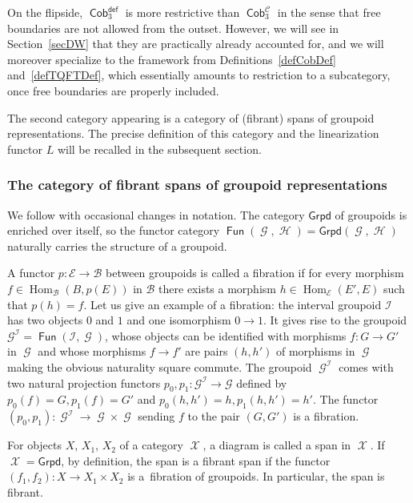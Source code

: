 \documentclass[pdftex]{sigma}
\DeclareMathOperator{\Hom}{Hom}
\DeclareMathOperator{\Fun}{\mathsf{Fun}}
\DeclareMathOperator{\Cob}{\mathsf{Cob}}
\DeclareMathOperator{\calc}{\mathcal{C}}
\DeclareMathOperator{\calx}{\mathcal{X}}
\DeclareMathOperator{\calg}{\mathcal{G}}
\DeclareMathOperator{\calh}{\mathcal{H}}
\DeclareMathOperator{\cali}{\mathcal{I}}
\numberwithin{equation}{section}
\theoremstyle{definition}
\begin{document}
On the flipside, $\Cob_3^{\mathsf{def}}$ is more restrictive than $\Cob_3^{\calc}$ in the sense that free boundaries are not allowed from the outset. However, we will see in Section~\ref{secDW} that they are practically already accounted for, and we will moreover specialize to the framework from Definitions~\ref{defCobDef} and~\ref{defTQFTDef}, which essentially amounts to restriction to a subcategory, once free boundaries are properly included.

The second category appearing is a category of (fibrant) spans of groupoid representations. The precise definition of this category and the linearization functor $L$ will be recalled in the subsequent section.

\subsubsection{The category of fibrant spans of groupoid representations}
We follow \cite[Section~2]{FMM} with occasional changes in notation.
The category $\mathsf{Grpd}$ of groupoids is enriched over itself, so the functor category $\Fun(\calg, \calh) = \mathsf{Grpd}(\calg, \calh)$ naturally carries the structure of a groupoid.

A functor $p\colon \mathcal{E} \rightarrow \mathcal{B}$ between groupoids is called a fibration if for every morphism $f \in \Hom_{\mathcal{B}}(B, p(E))$ in $\mathcal{B}$ there exists a morphism $h \in \Hom_{\mathcal{E}}(E', E)$ such that $p(h) = f$. Let us give an example of a fibration: the interval groupoid $\mathcal{I}$ has two objects $0$ and $1$ and one isomorphism ${0 \rightarrow 1}$. It gives rise to the groupoid $\mathcal{G}^{\mathcal{I}} = \Fun(\mathcal{I}, \calg)$, whose objects can be identified with morphisms $f\colon G \rightarrow G'$ in $\calg$ and whose morphisms $f \rightarrow f'$ are pairs $(h, h')$ of morphisms in $\calg$ making the obvious naturality square commute. The groupoid $\calg^{\mathcal{I}}$ comes with two natural projection functors $p_0, p_1\colon \mathcal{G}^{\mathcal{I}} \rightarrow \mathcal{G}$ defined by $p_0(f) = G, p_1(f) = G'$ and $p_0(h, h') = h, p_1(h, h') = h'$. The functor $(p_0, p_1)\colon \calg^{\cali} \rightarrow \calg \times \calg$ sending $f$ to the pair $(G, G')$ is a fibration.

For objects $X$, $X_1$, $X_2$ of a category $\calx$, a diagram  is called a span in $\calx$. If $\calx = \mathsf{Grpd}$, by definition, the span is a fibrant span if the functor $(f_1, f_2)\colon X \rightarrow X_1 \times X_2$ is a~fibration of groupoids. In particular, the span \smash{$\calg \xleftarrow{p_0} \calg^{\cali} \xrightarrow{p_1} \calg$} is fibrant.
\end{document}
